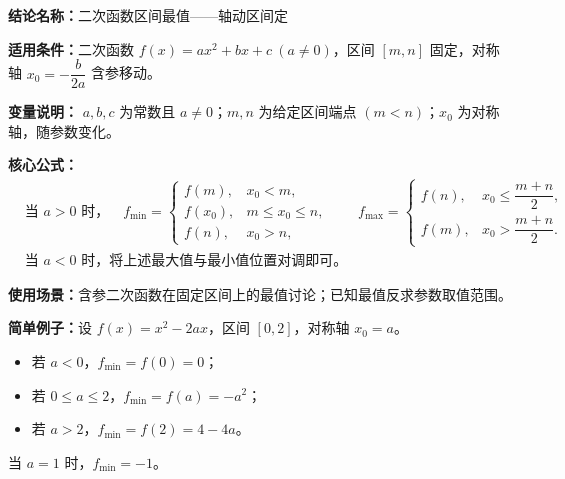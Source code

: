 \textbf{结论名称：}二次函数区间最值——轴动区间定

\textbf{适用条件：}二次函数 \(f(x)=ax^2+bx+c\ (a\neq0)\)，区间 \([m,n]\) 固定，对称轴 \(x_0=-\dfrac{b}{2a}\) 含参移动。

\textbf{变量说明：} \(a,b,c\) 为常数且 \(a\neq0\)；\(m,n\) 为给定区间端点 \((m<n)\)；\(x_0\) 为对称轴，随参数变化。

\textbf{核心公式：}
\[
\boxed{
\begin{aligned}
&\text{当 }a>0\text{ 时，}\quad
f_{\min}=
\begin{cases}
f(m), & x_0 < m,\\
f(x_0), & m \le x_0 \le n,\\
f(n), & x_0 > n,
\end{cases}\qquad
f_{\max}=
\begin{cases}
f(n), & x_0 \le \dfrac{m+n}{2},\\[4pt]
f(m), & x_0 > \dfrac{m+n}{2}.
\end{cases}\\[6pt]
&\text{当 }a<0\text{ 时，将上述最大值与最小值位置对调即可。}
\end{aligned}
}
\]

\textbf{使用场景：}含参二次函数在固定区间上的最值讨论；已知最值反求参数取值范围。

\textbf{简单例子：}设 \(f(x)=x^2-2ax\)，区间 \([0,2]\)，对称轴 \(x_0=a\)。
\begin{itemize}
  \item 若 \(a<0\)，\(f_{\min}=f(0)=0\)；
  \item 若 \(0\le a\le 2\)，\(f_{\min}=f(a)=-a^2\)；
  \item 若 \(a>2\)，\(f_{\min}=f(2)=4-4a\)。
\end{itemize}
当 \(a=1\) 时，\(f_{\min}=-1\)。